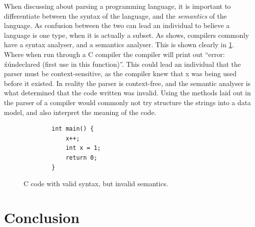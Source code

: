 When discussing about parsing a programming language, it is important to differentiate between the syntax of the language, and the \emph{semantics} of the language. As confusion between the two can lead an individual to believe a language is one type, when it is actually a subset. As \autocite{DragonBook} shows, compilers commonly have a syntax analyser, and a semantics analyser. This is shown clearly in \ref{fig:InvalidC}. Where when run through a C compiler the compiler will print out ``error: \'x\' undeclared (first use in this function)''. This could lead an individual that the parser must be context-sensitive, as the compiler knew that x was being used before it existed. In reality the parser is context-free, and the semantic analyser is what determined that the code written was invalid. Using the methods laid out in \autocite{DragonBook} the parser of a compiler would commonly not try structure the strings into a data model, and also interpret the meaning of the code.

\begin{figure}
    \begin{verbatim}
        int main() {
            x++;
            int x = 1;
            return 0;
        }
    \end{verbatim}
    \caption{C code with valid syntax, but invalid semantics.}
    \label{fig:InvalidC}
\end{figure}

\newpage
\section{Conclusion}
\newpage
